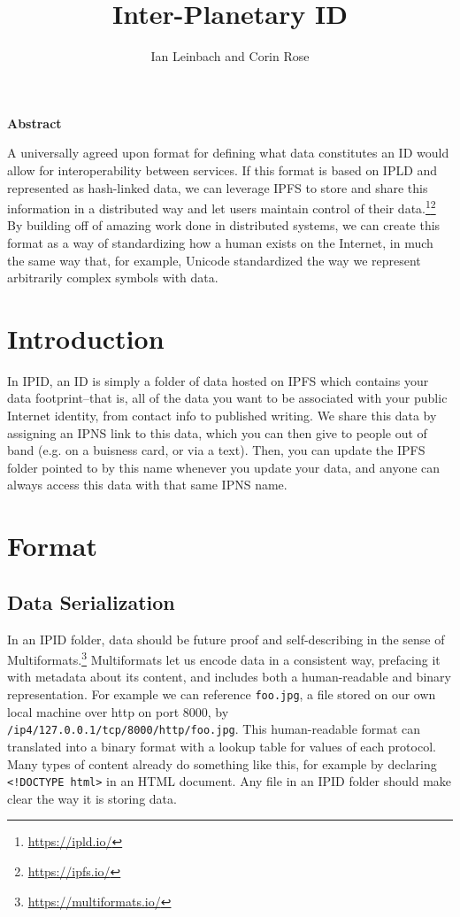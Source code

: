 \documentclass{article}
\author{Ian Leinbach and Corin Rose}
\title{Inter-Planetary ID}
\begin{document}
\maketitle

\begin{center}
\textbf{Abstract} 
\end{center}

A universally agreed upon format for defining what data constitutes an ID would allow for interoperability between services. If this format is based on IPLD and represented as hash-linked data, we can leverage IPFS to store and share this information in a distributed way and let users maintain control of their data.\footnote{\url{https://ipld.io/}}\footnote{\url{https://ipfs.io/}} By building off of amazing work done in distributed systems, we can create this format as a way of standardizing how a human exists on the Internet, in much the same way that, for example, Unicode standardized the way we represent arbitrarily complex symbols with data.  

\section{Introduction}
In IPID, an ID is simply a folder of data hosted on IPFS which contains your data footprint--that is, all of the data you want to be associated with your public Internet identity, from contact info to published writing. We share this data by assigning an IPNS link to this data, which you can then give to people out of band (e.g. on a buisness card, or via a text). Then, you can update the IPFS folder pointed to by this name whenever you update your data, and anyone can always access this data with that same IPNS name. 

\section{Format}

\subsection{Data Serialization}

In an IPID folder, data should be future proof and self-describing in the sense of Multiformats.\footnote{\url{https://multiformats.io/}} Multiformats let us encode data in a consistent way, prefacing it with metadata about its content, and includes both a human-readable and binary representation. For example we can reference \texttt{foo.jpg}, a file stored on our own local machine over http on port 8000, by \texttt{/ip4/127.0.0.1/tcp/8000/http\-/foo.jpg}. This human-readable format can translated into a binary format with a lookup table for values of each protocol. Many types of content already do something like this, for example by declaring \texttt{<!DOCTYPE html>} in an HTML document. Any file in an IPID folder should make clear the way it is storing data.   
\end{document}
